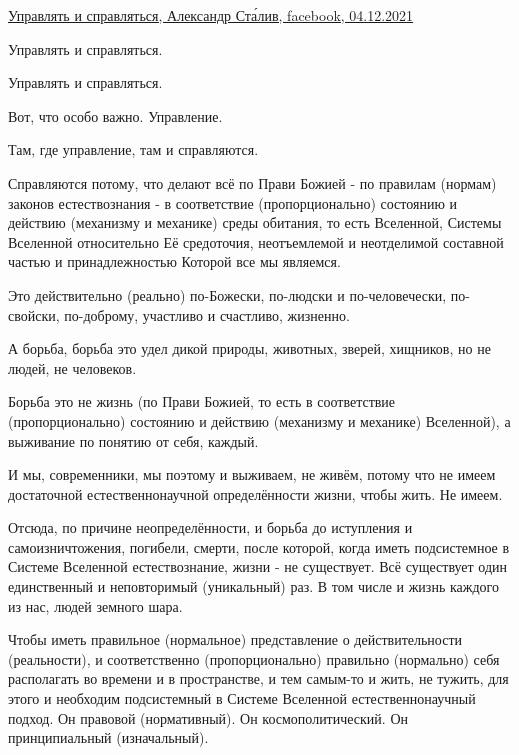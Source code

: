  
 
 
 
 


\href{https://m.facebook.com/story.php?story_fbid=4602500199844261&id=100002529780098}{%
Управлять и справляться, Александр Ста́лив, facebook, 04.12.2021%
}

\begin{multicols}{2}

Управлять и справляться. 

Управлять и справляться.

Вот, что особо важно. Управление.

Там, где управление, там и справляются.

Справляются потому, что делают всё по Прави Божией - по правилам (нормам)
законов естествознания - в соответствие (пропорционально) состоянию и действию
(механизму и механике) среды обитания, то есть Вселенной, Системы Вселенной
относительно Её средоточия, неотъемлемой и неотделимой составной частью и
принадлежностью Которой все мы являемся.

Это действительно (реально) по-Божески, по-людски и по-человечески, по-свойски,
по-доброму, участливо и счастливо, жизненно.

А борьба, борьба это удел дикой природы, животных, зверей, хищников, но не
людей, не человеков.

Борьба это не жизнь (по Прави Божией, то есть в соответствие (пропорционально)
состоянию и действию (механизму и механике) Вселенной), а выживание по понятию
от себя, каждый.

И мы, современники, мы поэтому и выживаем, не живём, потому что не имеем
достаточной естественнонаучной определённости жизни, чтобы жить. Не имеем.

Отсюда, по причине неопределённости, и борьба до иступления и самоизничтожения,
погибели, смерти, после которой, когда иметь подсистемное в Системе Вселенной
естествознание, жизни - не существует. Всё существует один единственный и
неповторимый (уникальный) раз. В том числе и жизнь каждого из нас, людей
земного шара.

Чтобы иметь правильное (нормальное) представление о действительности
(реальности), и соответственно (пропорционально) правильно (нормально) себя
располагать во времени и в пространстве, и тем самым-то и жить, не тужить, для
этого и необходим подсистемный в Системе Вселенной естественнонаучный подход.
Он правовой (нормативный). Он космополитический. Он принципиальный
(изначальный).


\end{multicols}

